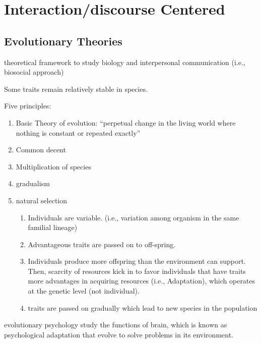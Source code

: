 \documentclass[
]{book}
\begin{document}
\hypertarget{interactiondiscourse-centered}{%
\chapter{Interaction/discourse Centered}\label{interactiondiscourse-centered}}

\hypertarget{evolutionary-theories}{%
\section{Evolutionary Theories}\label{evolutionary-theories}}

theoretical framework to study biology and interpersonal communication (i.e., biosocial approach)

Some traits remain relatively stable in species.

Five principles:

\begin{enumerate}
\def\labelenumi{\arabic{enumi}.}
\item
  Basic Theory of evolution: ``perpetual change in the living world where nothing is constant or repeated exactly''
\item
  Common decent
\item
  Multiplication of species
\item
  gradualism
\item
  natural selection

  \begin{enumerate}
  \def\labelenumii{\arabic{enumii}.}
  \item
    Individuals are variable. (i.e., variation among organism in the same familial lineage)
  \item
    Advantageous traits are passed on to off-spring.
  \item
    Individuals produce more offspring than the environment can support. Then, scarcity of resources kick in to
    favor individuals that have traits more advantages in acquiring resources (i.e., Adaptation), which operates at
    the genetic level (not individual).
  \item
    traits are passed on gradually which lead to new species in the population
  \end{enumerate}
\end{enumerate}

\citep{Tooby_2015} evolutionary psychology study the functions of brain, which is known as psychological adaptation that
evolve to solve problems in its environment.
\end{document}
